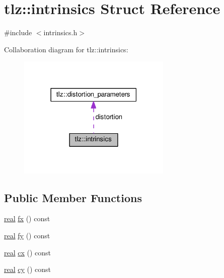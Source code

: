 \hypertarget{structtlz_1_1intrinsics}{}\section{tlz\+:\+:intrinsics Struct Reference}
\label{structtlz_1_1intrinsics}


{\ttfamily \#include $<$intrinsics.\+h$>$}



Collaboration diagram for tlz\+:\+:intrinsics\+:
\nopagebreak
\begin{figure}[H]
\begin{center}
\leavevmode
\includegraphics[width=207pt]{structtlz_1_1intrinsics__coll__graph}
\end{center}
\end{figure}
\subsection*{Public Member Functions}
\begin{DoxyCompactItemize}
\item 
\hyperlink{namespacetlz_a15fd37cce97f2b8b606af18c2615f602}{real} \hyperlink{structtlz_1_1intrinsics_ad5875d6c77076468aebce0d88ef61c20}{fx} () const 
\item 
\hyperlink{namespacetlz_a15fd37cce97f2b8b606af18c2615f602}{real} \hyperlink{structtlz_1_1intrinsics_a52e02ae0e8bbea245fcced1c38964f29}{fy} () const 
\item 
\hyperlink{namespacetlz_a15fd37cce97f2b8b606af18c2615f602}{real} \hyperlink{structtlz_1_1intrinsics_acc9b666adbc970c279c56a4549cc90d5}{cx} () const 
\item 
\hyperlink{namespacetlz_a15fd37cce97f2b8b606af18c2615f602}{real} \hyperlink{structtlz_1_1intrinsics_af7acb0b51e36fbb45d73bc10efef7d25}{cy} () const 
\end{DoxyCompactItemize}
